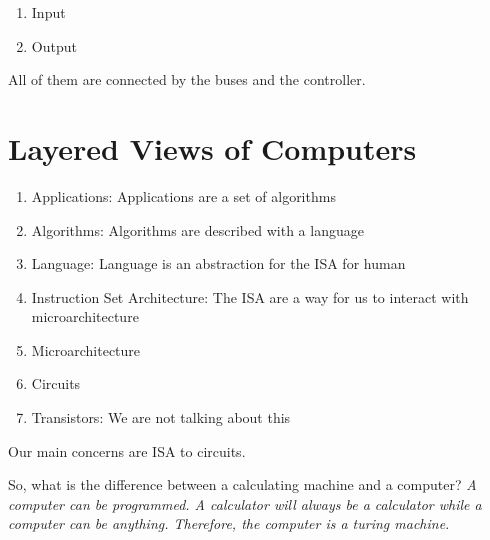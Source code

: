 \begin{enumerate}
    \item Input 
    \item Output
\end{enumerate}

All of them are connected by the buses and the controller. 

\section{Layered Views of Computers}
\begin{enumerate}
    \item Applications: Applications are a set of algorithms
    \item Algorithms: Algorithms are described with a language 
    \item Language: Language is an abstraction for the ISA for human
    \item Instruction Set Architecture: The ISA are a way for us to interact with microarchitecture  
    \item Microarchitecture 
    \item Circuits 
    \item Transistors: We are not talking about this
\end{enumerate}

Our main concerns are ISA to circuits. 

So, what is the difference between a calculating machine and a computer? \emph{A computer can be programmed. A calculator will always be a calculator while a computer can be anything. Therefore, the computer is a turing machine.}

